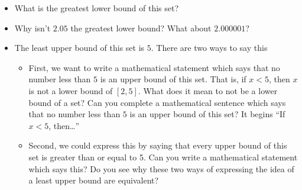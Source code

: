 \documentclass[11pt]{article}
\newenvironment{task}
	{\begin{mdframed}[linecolor=lightgray, linewidth=3pt]\raggedright}
	{\end{mdframed}}
\theoremstyle{definition}
\begin{document}
\begin{task}
\begin{itemize}
\begin{itemize}
        \item What is the greatest lower bound of this set? 
        \item Why isn't $2.05$ the greatest lower bound? What about $2.000001$?
        \item The least upper bound of this set is $5$. There are two ways to say this
          \begin{itemize}
            \item First, we want to write a mathematical statement which says that no number less than
          $5$ is an upper bound of this set.  That is, if $x < 5$, then $x$ is not a lower bound of $[2,5]$. What does it mean to not be
          a lower bound of a set? Can you complete a mathematical sentence which says that no number less than $5$ is an upper bound of
          this set? It begins ``If $x < 5$, then\dots''
          \item Second, we could express this by saying that every upper bound of this set is greater than or equal to 5. Can you
            write a mathematical statement which says this? Do you see why these two ways of expressing the idea of a least upper bound
            are equivalent?
          \end{itemize}
      \end{itemize}
  \end{itemize}
\end{task}\newpage
\end{document}
